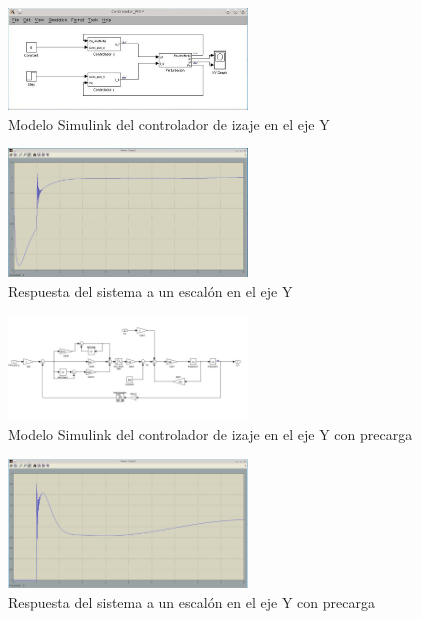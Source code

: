 \documentclass[journal]{IEEEtran}
\begin{document}
\begin{figure}[!t]
 \centering
  \includegraphics[width=2.5in]{Test_y.jpeg}
  \caption{Modelo Simulink del controlador de izaje en el eje Y}
  \label{fig:testy}
\end{figure}

\begin{figure}[!t]
 \centering
  \includegraphics[width=2.5in]{Test_y_posicion.jpeg}
  \caption{Respuesta del sistema a un escalón en el eje Y}
  \label{fig:resy}
\end{figure}

\begin{figure}[!t]
 \centering
  \includegraphics[width=2.5in]{Controlador_precarga.jpeg}
  \caption{Modelo Simulink del controlador de izaje en el eje Y con precarga}
  \label{fig:testyComp}
\end{figure}

\begin{figure}[!t]
 \centering
  \includegraphics[width=2.5in]{Controlador_prec_res.jpeg}
  \caption{Respuesta del sistema a un escalón en el eje Y con precarga}
  \label{fig:resyComp}
\end{figure}
\end{document}
